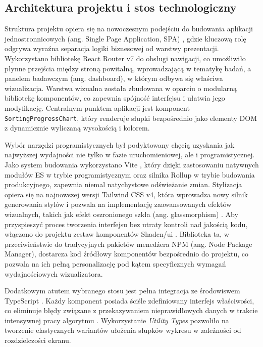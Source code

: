 \documentclass[12pt,openright,twoside]{report}
\begin{document}
\subsection{Architektura projektu i stos technologiczny}
Struktura projektu opiera się na nowoczesnym podejściu do budowania aplikacji jednostronnicowych (ang. Single Page Application, SPA) \cite{SPA_Definition}, gdzie kluczową rolę odgrywa wyraźna separacja logiki biznesowej od warstwy prezentacji. Wykorzystano bibliotekę React Router v7 do obsługi nawigacji, co umożliwiło płynne przejścia między stroną powitalną, wprowadzającą w tematykę badań, a panelem badawczym (ang. dashboard), w którym odbywa się właściwa wizualizacja. Warstwa wizualna została zbudowana w oparciu o modularną bibliotekę komponentów, co zapewnia spójność interfejsu i ułatwia jego modyfikację. Centralnym punktem aplikacji jest komponent \texttt{SortingProgressChart}, który renderuje słupki bezpośrednio jako elementy DOM z dynamicznie wyliczaną wysokością i kolorem.

Wybór narzędzi programistycznych był podyktowany chęcią uzyskania jak najwyższej wydajności nie tylko w fazie uruchomieniowej, ale i programistycznej. Jako system budowania wykorzystano Vite \cite{Vite_Official}, który dzięki zastosowaniu natywnych modułów ES \cite{ECMAScript_6} w trybie programistycznym oraz silnika Rollup w trybie budowania produkcyjnego, zapewnia niemal natychystowe odświeżanie zmian. Stylizacja opiera się na najnowszej wersji Tailwind CSS v4, która wprowadza nowy silnik generowania stylów i pozwala na implementację zaawansowanych efektów wizualnych, takich jak efekt oszronionego szkła (ang. glassmorphism) \cite{Tailwind_Official}. Aby przyspieszyć proces tworzenia interfejsu bez utraty kontroli nad jakością kodu, włączono do projektu zestaw komponentów Shadcn/ui \cite{Shadcn_UI}. Biblioteka ta, w przeciwieństwie do tradycyjnych pakietów menedżera NPM (ang. Node Package Manager), dostarcza kod źródłowy komponentów bezpośrednio do projektu, co pozwala na ich pełną personalizację pod kątem specyficznych wymagań wydajnościowych wizualizatora.

Dodatkowym atutem wybranego stosu jest pełna integracja ze środowiswem TypeScript \cite{TypeScript_Official}. Każdy komponent posiada ściśle zdefiniowany interfejs właściwości, co eliminuje błędy związane z przekazywaniem nieprawidłowych danych w trakcie intensywnej pracy algorytmu \cite{Learning_TS}. Wykorzystanie \textit{Utility Types} pozwoliło na tworzenie elastycznych wariantów ułożenia słupków wykresu w zależności od rozdzielczości ekranu.
\end{document}
